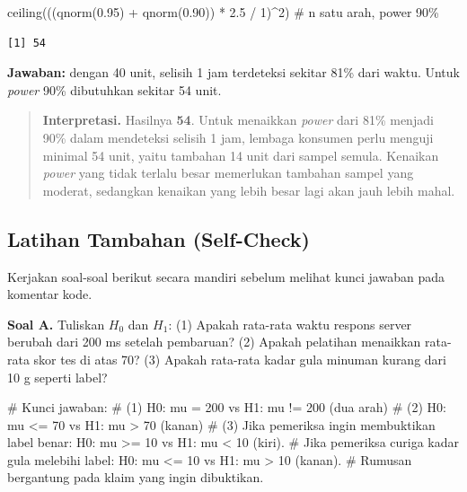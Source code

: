 \documentclass[
  indonesian,
  letterpaper,
]{book}
\newenvironment{Shaded}{\begin{snugshade}}{\end{snugshade}}
\newcommand{\CommentTok}[1]{\textcolor[rgb]{0.37,0.37,0.37}{#1}}
\newcommand{\DecValTok}[1]{\textcolor[rgb]{0.68,0.00,0.00}{#1}}
\newcommand{\FloatTok}[1]{\textcolor[rgb]{0.68,0.00,0.00}{#1}}
\newcommand{\FunctionTok}[1]{\textcolor[rgb]{0.28,0.35,0.67}{#1}}
\newcommand{\NormalTok}[1]{\textcolor[rgb]{0.00,0.23,0.31}{#1}}
\newcommand{\SpecialCharTok}[1]{\textcolor[rgb]{0.37,0.37,0.37}{#1}}
\begin{document}
\begin{Shaded}
\begin{Highlighting}[]
\FunctionTok{ceiling}\NormalTok{(((}\FunctionTok{qnorm}\NormalTok{(}\FloatTok{0.95}\NormalTok{) }\SpecialCharTok{+} \FunctionTok{qnorm}\NormalTok{(}\FloatTok{0.90}\NormalTok{)) }\SpecialCharTok{*} \FloatTok{2.5} \SpecialCharTok{/} \DecValTok{1}\NormalTok{)}\SpecialCharTok{\^{}}\DecValTok{2}\NormalTok{)   }\CommentTok{\# n satu arah, power 90\%}
\end{Highlighting}
\end{Shaded}

\begin{verbatim}
[1] 54
\end{verbatim}

\textbf{Jawaban:} dengan 40 unit, selisih 1 jam terdeteksi sekitar 81\%
dari waktu. Untuk \emph{power} 90\% dibutuhkan sekitar 54 unit.

\begin{quote}
\textbf{Interpretasi.} Hasilnya \textbf{54}. Untuk menaikkan
\emph{power} dari 81\% menjadi 90\% dalam mendeteksi selisih 1 jam,
lembaga konsumen perlu menguji minimal 54 unit, yaitu tambahan 14 unit
dari sampel semula. Kenaikan \emph{power} yang tidak terlalu besar
memerlukan tambahan sampel yang moderat, sedangkan kenaikan yang lebih
besar lagi akan jauh lebih mahal.
\end{quote}

\subsection{Latihan Tambahan
(Self-Check)}\label{latihan-tambahan-self-check-1}

Kerjakan soal-soal berikut secara mandiri sebelum melihat kunci jawaban
pada komentar kode.

\textbf{Soal A.} Tuliskan \(H_0\) dan \(H_1\): (1) Apakah rata-rata
waktu respons server berubah dari 200 ms setelah pembaruan? (2) Apakah
pelatihan menaikkan rata-rata skor tes di atas 70? (3) Apakah rata-rata
kadar gula minuman kurang dari 10 g seperti label?

\begin{Shaded}
\begin{Highlighting}[]
\CommentTok{\# Kunci jawaban:}
\CommentTok{\# (1) H0: mu = 200   vs H1: mu != 200  (dua arah)}
\CommentTok{\# (2) H0: mu \textless{}= 70   vs H1: mu \textgreater{} 70    (kanan)}
\CommentTok{\# (3) Jika pemeriksa ingin membuktikan label benar: H0: mu \textgreater{}= 10 vs H1: mu \textless{} 10 (kiri).}
\CommentTok{\#     Jika pemeriksa curiga kadar gula melebihi label: H0: mu \textless{}= 10 vs H1: mu \textgreater{} 10 (kanan).}
\CommentTok{\#     Rumusan bergantung pada klaim yang ingin dibuktikan.}
\end{Highlighting}
\end{Shaded}
\end{document}
